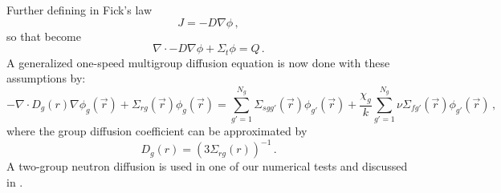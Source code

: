 Further defining in Fick's law 
\begin{equation}
  J = - D\nabla \phi \, ,
 \label{eq:Fick}
\end{equation}
so that  become 
\begin{equation}
 \nabla \cdot - D \nabla \phi + \Sigma_t \phi = Q \, .
 \label{eq:diffusion_ez2}
\end{equation}
A generalized one-speed multigroup diffusion equation is now done with these assumptions by:
\begin{equation}
  -\nabla \cdot D_g(r) \nabla \phi_g(\vec{r}) + \Sigma_{r g}(\vec{r}) \phi_{g}(\vec{r}) = \sum\limits^{N_g}_{g'=1} \Sigma_{s g g'}(\vec{r}) \phi_{g'}(\vec{r}) +\frac{\chi_g}{k} \sum\limits^{N_g}_{g'=1} \nu\Sigma_{fg'}(\vec{r}) \phi_{g'}(\vec{r}) \, ,
\label{eq:diffusion}
\end{equation}
where the group diffusion coefficient can be approximated by 
\begin{equation}
   D_g(r) = (3\Sigma_{rg}(r))^{-1} \, .
\label{eq:diff_coef}
\end{equation}
A two-group neutron diffusion  is used in one of our numerical tests and discussed in .







